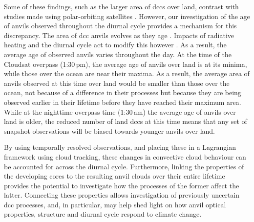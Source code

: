 Some of these findings, such as the larger area of \acrshort{dcc}s over land, contrast with studies made using polar-orbiting satellites \citep{ge_contrasting_2024}.
However, our investigation of the age of anvils observed throughout the diurnal cycle provides a mechanism for this discrepancy.
The area of \acrshort{dcc} anvils evolves as they age \citep{futyan_deep_2007}.
Impacts of radiative heating and the diurnal cycle act to modify this however \citep{gasparini_diurnal_2022}.
As a result, the average age of observed anvils varies throughout the day.
At the time of the Cloudsat overpass (1:30\,pm), the average age of anvils over land is at its minima, while those over the ocean are near their maxima.
As a result, the average area of anvils observed at this time over land would be smaller than those over the ocean, not because of a difference in their processes but because they are being observed earlier in their lifetime before they have reached their maximum area.
While at the nighttime overpass time (1:30\,am) the average age of anvils over land is older, the reduced number of land \acrshort{dcc}s at this time means that any set of snapshot observations will be biased towards younger anvils over land.

By using temporally resolved observations, and placing these in a Lagrangian framework using cloud tracking, these changes in convective cloud behaviour can be accounted for across the diurnal cycle.
Furthermore, linking the properties of the developing cores to the resulting anvil clouds over their entire lifetime provides the potential to investigate how the processes of the former affect the latter.
Connecting these properties allows investigation of previously uncertain \acrshort{dcc} processes, and, in particular, may help shed light on how anvil optical properties, structure and diurnal cycle respond to climate change.
